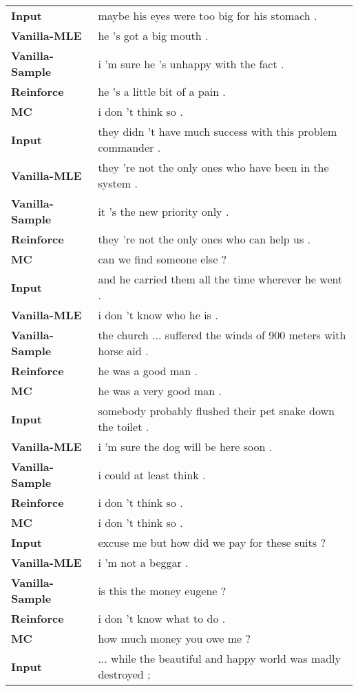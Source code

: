 \begin{table*}[!htb]
\centering
\footnotesize
\begin{tabular}{p{4cm}p{8cm}}\toprule
{\bf Input}&maybe his eyes were too big for his stomach .\\
{\bf Vanilla-MLE}&he 's got a big mouth .\\
{\bf Vanilla-Sample}&i 'm sure he 's unhappy with the fact .\\
{\bf Reinforce}&he 's a little bit of a pain .\\
{\bf MC}&i don 't think so .\\\midrule
{\bf Input}&they didn 't have much success with this problem commander .\\
{\bf Vanilla-MLE}&they 're not the only ones who have been in the system .\\
{\bf Vanilla-Sample}&it 's the new priority only .\\
{\bf Reinforce}&they 're not the only ones who can help us .\\
{\bf MC}&can we find someone else ?\\\midrule
{\bf Input}&and he carried them all the time wherever he went .\\
{\bf Vanilla-MLE}&i don 't know who he is .\\
{\bf Vanilla-Sample}&the church ... suffered the winds of 900 meters with horse aid .\\
{\bf Reinforce}&he was a good man .\\
{\bf MC}&he was a very good man .\\\midrule
{\bf Input}&somebody probably flushed their pet snake down the toilet .\\
{\bf Vanilla-MLE}&i 'm sure the dog will be here soon .\\
{\bf Vanilla-Sample}&i could at least think .\\
{\bf Reinforce}&i don 't think so .\\
{\bf MC}&i don 't think so .\\\midrule
{\bf Input}&excuse me but how did we pay for these suits ?\\
{\bf Vanilla-MLE}&i 'm not a beggar .\\
{\bf Vanilla-Sample}&is this the money eugene ?\\
{\bf Reinforce}&i don 't know what to do .\\
{\bf MC}& how much money you owe me ?\\\midrule
{\bf Input}&... while the beautiful and happy world was madly destroyed ;\\

\end{tabular}
\end{table*}
